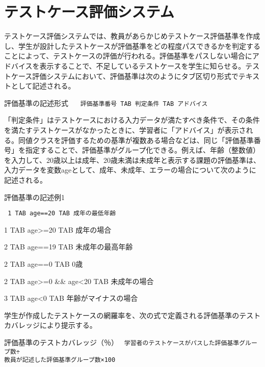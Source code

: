 \documentclass{tpu-sotu}
\begin{document}
\section{テストケース評価システム}
テストケース評価システムでは、教員があらかじめテストケース評価基準を作成し、学生が設計したテストケースが評価基準をどの程度パスできるかを判定することによって、テストケースの評価が行われる。評価基準をパスしない場合にアドバイスを表示することで、不足しているテストケースを学生に知らせる。テストケース評価システムにおいて、評価基準は次のようにタブ区切り形式でテキストとして記述される。

\begin{minipage}[b]{.7\textwidth}
\begin{itembox}[l]{評価基準の記述形式}
{\tt
　評価基準番号 TAB 判定条件 TAB アドバイス
}
\end{itembox}
\end{minipage}

「判定条件」はテストケースにおける入力データが満たすべき条件で、その条件を満たすテストケースがなかったときに、学習者に「アドバイス」が表示される。同値クラスを評価するための基準が複数ある場合などは、同じ「評価基準番号」を指定することで、評価基準がグループ化できる。例えば、年齢（整数値）を入力して、20歳以上は成年、20歳未満は未成年と表示する課題の評価基準は、入力データを変数ageとして、成年、未成年、エラーの場合について次のように記述される。

\begin{minipage}[b]{.7\textwidth}
\begin{itembox}[l]{評価基準の記述例1}
{\tt
1 TAB age==20 TAB 成年の最低年齢

1 TAB age>=20 TAB 成年の場合

2 TAB age==19 TAB 未成年の最高年齢

2 TAB age==0 TAB 0歳

2 TAB age>=0 \&\& age<20 TAB 未成年の場合

3 TAB age<0 TAB 年齢がマイナスの場合
}
\end{itembox}
\end{minipage}

学生が作成したテストケースの網羅率を、次の式で定義される評価基準のテストカバレッジにより提示する。

\begin{minipage}[b]{.7\textwidth}
\begin{itembox}[l]{評価基準のテストカバレッジ（％）}
{\tt
学習者のテストケースがパスした評価基準グループ数÷\\教員が記述した評価基準グループ数×100
}
\end{itembox}
\end{minipage}
\end{document}
